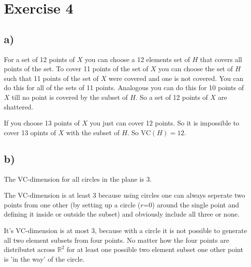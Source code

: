 \section*{Exercise 4}
\subsection*{a)}
For a set of 12 points of $X$ you can choose a 12 elements set of $H$ that covers all points of the set.
To cover 11 points of the set of $X$ you can choose  the set of $H$ such that 11 points of the set of $X$ were covered and one is not covered. You can do this for all of the sets of 11 points. Analogous you can do this for 10 points of $X$ till no point is covered by the subset of $H$.
So a set of 12 points of $X$ are shattered.

If you choose 13 points of $X$ you just can cover 12 points. So it is impossible to cover 13 opints of $X$ with the subset of $H$.
So $\text{VC}(H)=12$.

\subsection*{b)}
The VC-dimension for all circles in the plane is 3.

The VC-dimension is at least 3 because using circles one can always seperate two points from one other  (by setting up a circle ($r$=0) around the single point and defining it inside or outside the subset) and obviously include all three or none.

It's VC-dimension is at most 3, because with a circle it is not possible to generate all two element subsets from four points.
No matter how the four points are distributet across $\mathbb{R}^2$ for at least one possible two element subset one other point is 'in the way' of the circle.

